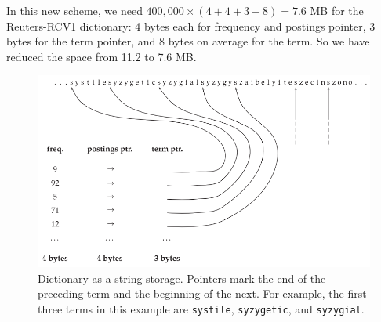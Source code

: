 \documentclass[letterpaper,11pt]{article}
\newcommand{\code}[1]{\texttt{#1}}
\begin{document}
In this new scheme, we need $400,000 \times (4 + 4 + 3 + 8) = 7.6$ MB for the Reuters-RCV1 dictionary: 4 bytes each for frequency and postings pointer, 3 bytes for the term pointer, and 8 bytes on average for the term. So we have reduced the space from 11.2 to 7.6 MB.
\begin{figure}[H]
    \centering
    \includegraphics[scale=0.60]{sect5/figure_5_4.png}
    \caption{Dictionary-as-a-string storage. Pointers mark the end of the preceding term and the beginning of the next. For example, the first three terms in this example are \code{systile}, \code{syzygetic}, and \code{syzygial}.}
\end{figure}
\end{document}
